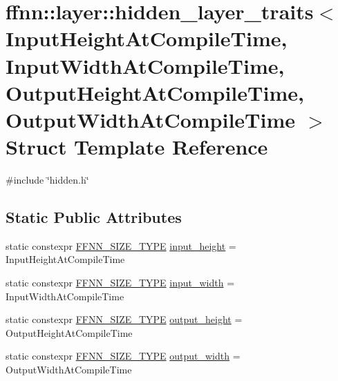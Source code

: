 \hypertarget{structffnn_1_1layer_1_1hidden__layer__traits}{\section{ffnn\-:\-:layer\-:\-:hidden\-\_\-layer\-\_\-traits$<$ Input\-Height\-At\-Compile\-Time, Input\-Width\-At\-Compile\-Time, Output\-Height\-At\-Compile\-Time, Output\-Width\-At\-Compile\-Time $>$ Struct Template Reference}
\label{structffnn_1_1layer_1_1hidden__layer__traits}
}


{\ttfamily \#include \char`\"{}hidden.\-h\char`\"{}}

\subsection*{Static Public Attributes}
\begin{DoxyCompactItemize}
\item 
static constexpr \hyperlink{global_8h_aab5a5a098c5bf31f4176f4a141d2ef65}{F\-F\-N\-N\-\_\-\-S\-I\-Z\-E\-\_\-\-T\-Y\-P\-E} \hyperlink{structffnn_1_1layer_1_1hidden__layer__traits_a9c859f99e696cfbf5900126b950c3111}{input\-\_\-height} = Input\-Height\-At\-Compile\-Time
\item 
static constexpr \hyperlink{global_8h_aab5a5a098c5bf31f4176f4a141d2ef65}{F\-F\-N\-N\-\_\-\-S\-I\-Z\-E\-\_\-\-T\-Y\-P\-E} \hyperlink{structffnn_1_1layer_1_1hidden__layer__traits_a4bf1eef4840757fb958c44e5e56b7e46}{input\-\_\-width} = Input\-Width\-At\-Compile\-Time
\item 
static constexpr \hyperlink{global_8h_aab5a5a098c5bf31f4176f4a141d2ef65}{F\-F\-N\-N\-\_\-\-S\-I\-Z\-E\-\_\-\-T\-Y\-P\-E} \hyperlink{structffnn_1_1layer_1_1hidden__layer__traits_ac0035aa1ae5f5418ec22f3b549a0b9ca}{output\-\_\-height} = Output\-Height\-At\-Compile\-Time
\item 
static constexpr \hyperlink{global_8h_aab5a5a098c5bf31f4176f4a141d2ef65}{F\-F\-N\-N\-\_\-\-S\-I\-Z\-E\-\_\-\-T\-Y\-P\-E} \hyperlink{structffnn_1_1layer_1_1hidden__layer__traits_ab9b8ea313b1b38c02f790ed937927c48}{output\-\_\-width} = Output\-Width\-At\-Compile\-Time
\end{DoxyCompactItemize}


